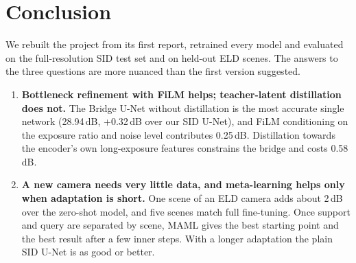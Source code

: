 \section{Conclusion}
\label{sec:conclusion}

We rebuilt the project from its first report, retrained every model and evaluated on the full-resolution SID test set and on held-out ELD scenes. The answers to the three questions are more nuanced than the first version suggested.

\begin{enumerate}
\item \textbf{Bottleneck refinement with FiLM helps; teacher-latent distillation does not.} The Bridge U-Net without distillation is the most accurate single network (28.94\,dB, +0.32\,dB over our SID U-Net), and FiLM conditioning on the exposure ratio and noise level contributes 0.25\,dB. Distillation towards the encoder's own long-exposure features constrains the bridge and costs 0.58\,dB.
\item \textbf{A new camera needs very little data, and meta-learning helps only when adaptation is short.} One scene of an ELD camera adds about 2\,dB over the zero-shot model, and five scenes match full fine-tuning. Once support and query are separated by scene, MAML gives the best starting point and the best result after a few inner steps. With a longer adaptation the plain SID U-Net is as good or better.

\end{enumerate}
